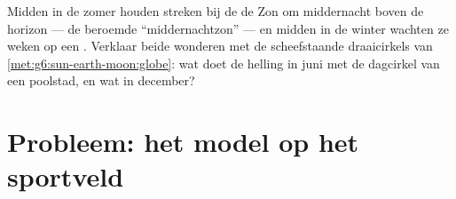 \begin{exercise}[$\star\star\star$]\label{exo:g6:sun-earth-moon:12}
Midden in de zomer houden streken bij de  de Zon om
middernacht boven de horizon --- de beroemde ``middernachtzon'' ---
en midden in de winter wachten ze weken op een . Verklaar
beide wonderen met de scheefstaande draaicirkels van
\cref{met:g6:sun-earth-moon:globe}: wat doet de helling in juni met de
dagcirkel van een poolstad, en wat in december?
\end{exercise}

\section{Probleem: het model op het sportveld}

